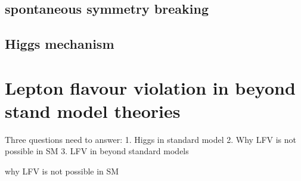 \subsection{spontaneous symmetry breaking}



\subsection{Higgs mechanism}




\section{Lepton flavour violation in beyond stand model theories}


Three questions need to answer:
1. Higgs in standard model
2. Why LFV is not possible in SM
3. LFV in beyond standard models

why LFV is not possible in SM